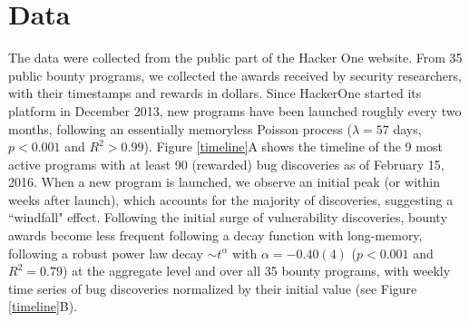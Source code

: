 \section{Data}
\label{sec:data}
The data were collected from the public part of the Hacker One website. From 35 public bounty programs, we collected the awards received by security researchers, with their timestamps and rewards in dollars. Since HackerOne started its platform in December 2013, new programs have been launched roughly every two months, following an essentially memoryless Poisson process ($\lambda = 57$ days, $p < 0.001$ and $R^2 > 0.99$). Figure \ref{timeline}A shows the timeline of the 9 most active programs with at least 90 (rewarded) bug discoveries as of February 15, 2016. When a new program is launched, we observe an initial peak (or within weeks after launch), which accounts for the majority of discoveries, suggesting a ``windfall" effect. Following the initial surge of vulnerability discoveries, bounty awards become less frequent following a decay function with long-memory, following a robust power law decay $\sim t^{\alpha}$ with $\alpha = -0.40(4)$ ($p < 0.001$ and $R^2 = 0.79$) at the aggregate level and over all 35 bounty programs, with weekly time series of bug discoveries normalized by their initial value (see Figure \ref{timeline}B).\\


